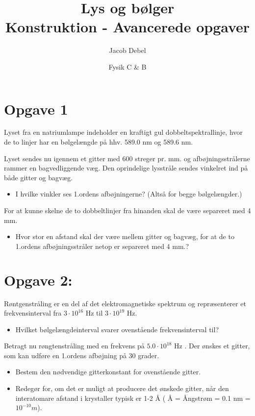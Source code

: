 \documentclass[a4paper, 12pt]{article}
\author{Jacob Debel}
\date{Fysik C \& B}
\title{Lys og bølger\\\medskip
\large Konstruktion - Avancerede opgaver}
\begin{document}
\maketitle



\section*{Opgave 1}
\label{sec:orgd71628b}

Lyset fra en natriumlampe indeholder en kraftigt gul dobbeltspektrallinje, hvor de to linjer har en
bølgelængde på hhv. 589.0 nm og 589.6 nm.

Lyset sendes nu igennem et gitter med 600 streger pr. mm. og afbøjningsstrålerne rammer en
bagvedliggende væg. Den oprindelige lysstråle sendes vinkelret ind på både gitter og bagvæg.

\begin{itemize}
\item I hvilke vinkler ses 1.ordens afbøjningerne? (Altså for begge bølgelængder.)
\end{itemize}

For at kunne skelne de to dobbeltlinjer fra hinanden skal de være separeret med 4 mm.

\begin{itemize}
\item Hvor stor en afstand skal der være mellem gitter og bagvæg, for at de to 1.ordens afbøjningsstråler netop er separeret med 4 mm.?
\end{itemize}

\section*{Opgave 2:}
\label{sec:orge20bb3c}

Røntgenstråling er en del af det elektromagnetiske spektrum og repræsenterer et frekvensinterval fra \(3 \cdot 10^{16}\) Hz til \(3\cdot 10^{19}\) Hz.

\begin{itemize}
\item Hvilket bølgelængdeinterval svarer ovenstående frekvensinterval til?
\end{itemize}

Betragt nu røngtenstråling med en frekvens på \(5.0\cdot 10^{18}\) Hz . Der ønskes et gitter, som kan
udføre en 1.ordens afbøjning på 30 grader.

\begin{itemize}
\item Bestem den nødvendige gitterkonstant for ovenstående gitter.

\item Redegør for, om det er muligt at producere det ønskede gitter, når den interatomare afstand i krystaller typisk er 1-2 Å ( Å = Ångstrøm = 0.1 nm = \(10^{-10} m\)).
\end{itemize}
\newpage
\end{document}
